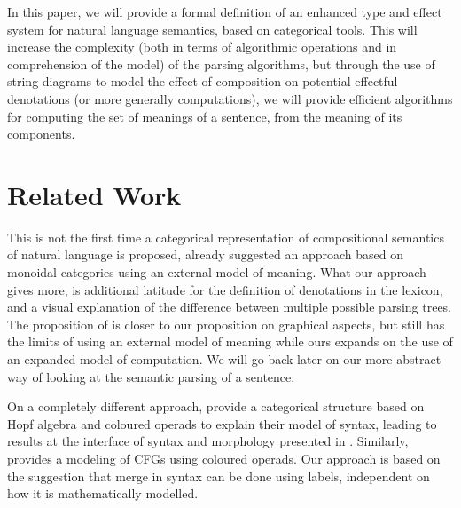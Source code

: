\documentclass[a4paper,UKenglish,cleveref, autoref, thm-restate]{lipics-v2021}
\begin{document}
\smallskip

In this paper, we will provide a formal definition of an enhanced type and
effect system for natural language semantics, based on categorical tools.
This will increase the complexity (both in terms of algorithmic operations and
in comprehension of the model) of the parsing algorithms, but through the use
of string diagrams to model the effect of composition on potential effectful
denotations (or more generally computations), we will provide efficient
algorithms for computing the set of meanings of a sentence, from the meaning of
its components.

\section{Related Work}
This is not the first time a categorical representation of compositional
semantics of natural language is proposed,
\cite{coeckeMathematicalFoundationsCompositional2010} already suggested an
approach based on monoidal categories using an external model of meaning.
What our approach gives more, is additional latitude for the definition of
denotations in the lexicon, and a visual explanation of the difference between
multiple possible parsing trees.
The proposition of \cite{toumiHigherOrderDisCoCatPeirceLambekMontague2023} is
closer to our proposition on graphical aspects, but still has the limits of
using an external model of meaning while ours expands on the use of an expanded
model of computation.
We will go back later on our more abstract way of looking at the semantic
parsing of a sentence.

\smallskip

On a completely different approach,
\cite{marcollimatildeetchomskynoametberwickrobertc.MathematicalStructureSyntactic}
provide a categorical structure based on Hopf algebra and coloured operads
to explain their model of syntax, leading to results at the interface of syntax
and morphology presented in \cite{senturiaAlgebraicStructureMorphosyntax2025}.
Similarly, \cite{melliesCategoricalContoursChomskySchutzenberger2025} provides
a modeling of CFGs using coloured operads.
Our approach is based on the suggestion that merge in syntax can be done using
labels, independent on how it is mathematically modelled.






\end{document}
